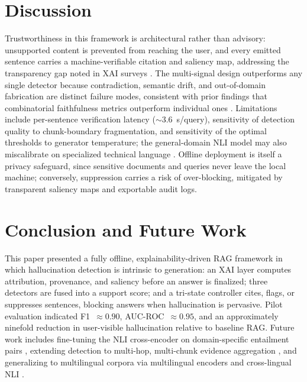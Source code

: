 \documentclass[conference]{IEEEtran}
\begin{document}
\section{Discussion}
Trustworthiness in this framework is architectural rather than advisory: unsupported content is prevented from reaching the user, and every emitted sentence carries a machine-verifiable citation and saliency map, addressing the transparency gap noted in XAI surveys \cite{minaee2024xai}. The multi-signal design outperforms any single detector because contradiction, semantic drift, and out-of-domain fabrication are distinct failure modes, consistent with prior findings that combinatorial faithfulness metrics outperform individual ones \cite{malin2025faithfulness}. Limitations include per-sentence verification latency ($\sim$3.6~s/query), sensitivity of detection quality to chunk-boundary fragmentation, and sensitivity of the optimal thresholds to generator temperature; the general-domain NLI model may also miscalibrate on specialized technical language \cite{laban2022summac,shwartz2024crosslingual}. Offline deployment is itself a privacy safeguard, since sensitive documents and queries never leave the local machine; conversely, suppression carries a risk of over-blocking, mitigated by transparent saliency maps and exportable audit logs.

\section{Conclusion and Future Work}
This paper presented a fully offline, explainability-driven RAG framework in which hallucination detection is intrinsic to generation: an XAI layer computes attribution, provenance, and saliency before an answer is finalized; three detectors are fused into a support score; and a tri-state controller cites, flags, or suppresses sentences, blocking answers when hallucination is pervasive. Pilot evaluation indicated F1~$\approx 0.90$, AUC-ROC~$\approx 0.95$, and an approximately ninefold reduction in user-visible hallucination relative to baseline RAG. Future work includes fine-tuning the NLI cross-encoder on domain-specific entailment pairs \cite{krainovskikh2026domain}, extending detection to multi-hop, multi-chunk evidence aggregation \cite{liu2024hallucinationqa,yan2024crag}, and generalizing to multilingual corpora via multilingual encoders and cross-lingual NLI \cite{shwartz2024crosslingual}.



\end{document}
